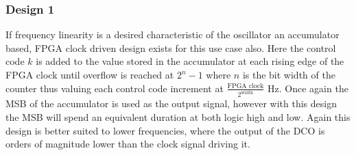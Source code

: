 \documentclass[conference]{IEEEtran}
\begin{document}

\subsubsection*{Design 1}
If frequency linearity is a desired characteristic of the oscillator an accumulator based, FPGA clock driven design exists for this use case also. 
Here the control code $k$ is added to the value stored in the accumulator at each rising edge of the FPGA clock until overflow is reached at $2^n-1$ where $n$ is the bit width of the counter thus valuing each control code increment at $\frac{\textrm{FPGA clock}}{2^{\textrm{width}}}$ Hz. Once again the MSB of the accumulator is used as the output signal, however with this design the MSB will spend an equivalent duration at both logic high and low.
Again this design is better suited to lower frequencies, where the output of the DCO is orders of magnitude lower than the clock signal driving it.
\end{document}
